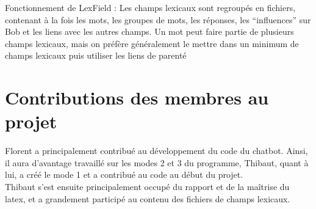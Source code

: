 \documentclass[paper=a4, 12pt]{report}
\begin{document}
\vspace{0.5cm}

Fonctionnement de LexField :
Les champs lexicaux sont regroupés en fichiers, contenant à la fois les mots, les groupes de mots, les réponses, les “influences” sur Bob et les liens avec les autres champs. Un mot peut faire partie de plusieurs champs lexicaux, mais on préfère généralement le mettre dans un minimum de champs lexicaux puis utiliser les liens de parenté


\section{Contributions des membres au projet}
\vspace{0.5cm}
Florent a principalement contribué au développement du code du chatbot. Ainsi, il aura d’avantage travaillé sur les modes 2 et 3 du programme, Thibaut, quant à lui, a créé le mode 1 et a contribué au code au début du projet. \\
Thibaut s’est ensuite principalement occupé du rapport et de la maîtrise du latex, et a grandement participé au contenu des fichiers de champs lexicaux.
\end{document}
